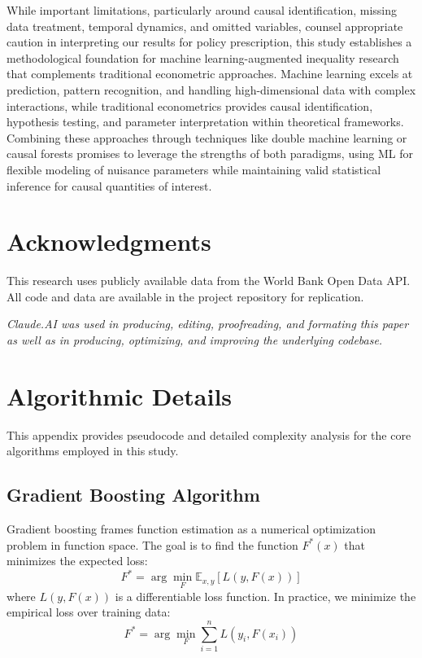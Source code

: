 \documentclass[10pt,twocolumn]{article}
\begin{document}
\par While important limitations, particularly around causal identification, missing data treatment, temporal dynamics, and omitted variables, counsel appropriate caution in interpreting our results for policy prescription, this study establishes a methodological foundation for machine learning-augmented inequality research that complements traditional econometric approaches. Machine learning excels at prediction, pattern recognition, and handling high-dimensional data with complex interactions, while traditional econometrics provides causal identification, hypothesis testing, and parameter interpretation within theoretical frameworks. Combining these approaches through techniques like double machine learning or causal forests promises to leverage the strengths of both paradigms, using ML for flexible modeling of nuisance parameters while maintaining valid statistical inference for causal quantities of interest.

\section*{Acknowledgments}
\par This research uses publicly available data from the World Bank Open Data API. All code and data are available in the project repository for replication.
\par \textit{Claude.AI was used in producing, editing, proofreading, and formating this paper as well as in producing, optimizing, and improving the underlying codebase.}



\onecolumn
\clearpage
\appendix

\section{Algorithmic Details}

This appendix provides pseudocode and detailed complexity analysis for the core algorithms employed in this study.

\subsection{Gradient Boosting Algorithm}

Gradient boosting frames function estimation as a numerical optimization problem in function space. The goal is to find the function $F^*(x)$ that minimizes the expected loss:
\begin{equation}
F^* = \arg\min_F \mathbb{E}_{x,y}[L(y, F(x))]
\end{equation}
where $L(y, F(x))$ is a differentiable loss function. In practice, we minimize the empirical loss over training data:
\begin{equation}
F^* = \arg\min_F \sum_{i=1}^n L(y_i, F(x_i))
\end{equation}
\end{document}
